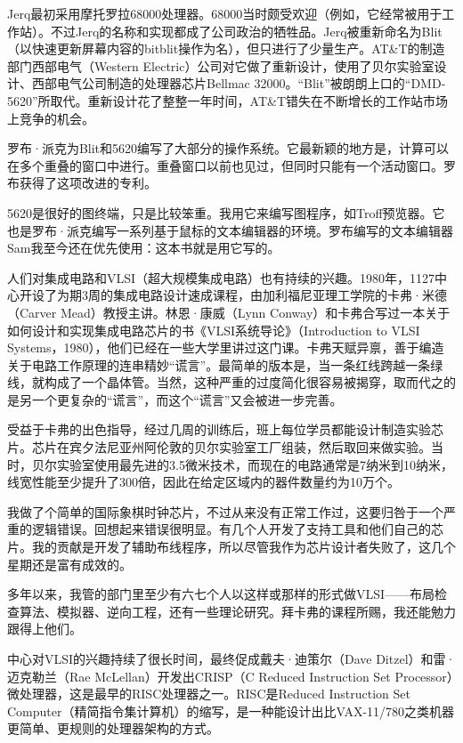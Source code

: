 \documentclass[a4paper,12pt,UTF8,twoside]{ctexbook}
\begin{document}
{{Jerq最初采用摩托罗拉68000处理器。68000当时颇受欢迎（例如，它经常被用于工作站）。不过Jerq的名称和实现都成了公司政治的牺牲品。Jerq被重新命名为Blit（以快速更新屏幕内容的bitblit操作为名），但只进行了少量生产。AT\&T的制造部门西部电气（Western Electric）公司对它做了重新设计，使用了贝尔实验室设计、西部电气公司制造的处理器芯片Bellmac 32000。“Blit”被朗朗上口的“DMD-5620”所取代。重新设计花了整整一年时间，AT\&T错失在不断增长的工作站市场上竞争的机会。

罗布·派克为Blit和5620编写了大部分的操作系统。它最新颖的地方是，计算可以在多个重叠的窗口中进行。重叠窗口以前也见过，但同时只能有一个活动窗口。罗布获得了这项改进的专利。

5620是很好的图终端，只是比较笨重。我用它来编写图程序，如Troff预览器。它也是罗布·派克编写一系列基于鼠标的文本编辑器的环境。罗布编写的文本编辑器Sam我至今还在优先使用：这本书就是用它写的。

人们对集成电路和VLSI（超大规模集成电路）也有持续的兴趣。1980年，1127中心开设了为期3周的集成电路设计速成课程，由加利福尼亚理工学院的卡弗·米德（Carver Mead）教授主讲。林恩·康威（Lynn Conway）和卡弗合写过一本关于如何设计和实现集成电路芯片的书《VLSI系统导论》（Introduction to VLSI Systems，1980），他们已经在一些大学里讲过这门课。卡弗天赋异禀，善于编造关于电路工作原理的连串精妙“谎言”。最简单的版本是，当一条红线跨越一条绿线，就构成了一个晶体管。当然，这种严重的过度简化很容易被揭穿，取而代之的是另一个更复杂的“谎言”，而这个“谎言”又会被进一步完善。

受益于卡弗的出色指导，经过几周的训练后，班上每位学员都能设计制造实验芯片。芯片在宾夕法尼亚州阿伦敦的贝尔实验室工厂组装，然后取回来做实验。当时，贝尔实验室使用最先进的3.5微米技术，而现在的电路通常是7纳米到10纳米，线宽性能至少提升了300倍，因此在给定区域内的器件数量约为10万个。

我做了个简单的国际象棋时钟芯片，不过从来没有正常工作过，这要归咎于一个严重的逻辑错误。回想起来错误很明显。有几个人开发了支持工具和他们自己的芯片。我的贡献是开发了辅助布线程序，所以尽管我作为芯片设计者失败了，这几个星期还是富有成效的。

多年以来，我管的部门里至少有六七个人以这样或那样的形式做VLSI——布局检查算法、模拟器、逆向工程，还有一些理论研究。拜卡弗的课程所赐，我还能勉力跟得上他们。

中心对VLSI的兴趣持续了很长时间，最终促成戴夫·迪策尔（Dave Ditzel）和雷·迈克勒兰（Rae McLellan）开发出CRISP（C Reduced Instruction Set Processor）微处理器，这是最早的RISC处理器之一。RISC是Reduced Instruction Set Computer（精简指令集计算机）的缩写，是一种能设计出比VAX-11/780之类机器更简单、更规则的处理器架构的方式。

}}
\end{document}
